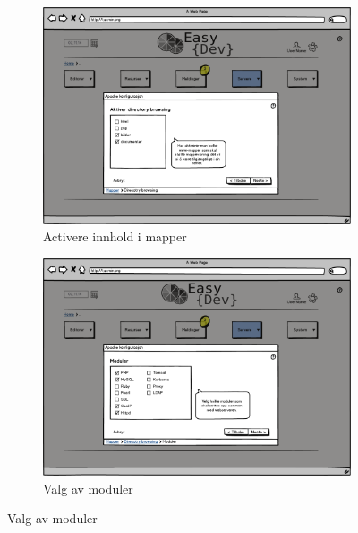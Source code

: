 \begin{figure}[p]
        \vspace{0.6cm}
        \begin{subfigure}[b]{0.48\textwidth}
                \includegraphics[width=\textwidth]
                {./img/prosessdokumentasjon/lowfi/apache3.png}
                \caption{Activere innhold i mapper}
                \label{fig:apache3}
        \end{subfigure}
        \hspace{0.05cm}
        \begin{subfigure}[b]{0.48\textwidth}
                \includegraphics[width=\textwidth]
                {./img/prosessdokumentasjon/lowfi/apache4.png}
                \caption{Valg av moduler}
                \label{fig:apache4}
        \end{subfigure}
        

\end{figure}
